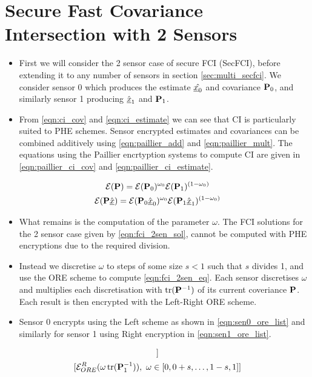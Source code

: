 \documentclass[letterpaper, 10 pt, conference]{ieeeconf}  %
\begin{document}
\section{Secure Fast Covariance Intersection with 2 Sensors} \label{sec:secfci}
\begin{itemize}
   \item First we will consider the 2 sensor case of secure FCI (SecFCI), before extending it to any number of sensors in section \ref{sec:multi_secfci}. We consider sensor 0 which produces the estimate $\hat{{\underline{x}}_0}$ and covariance ${{\mathbf{P}}}_0$, and similarly sensor 1 producing $\hat{{\underline{x}}}_1$ and ${{\mathbf{P}}}_1$.
   \item From \eqref{eqn:ci_cov} and \eqref{eqn:ci_estimate} we can see that CI is particularly suited to PHE schemes. Sensor encrypted estimates and covariances can be combined additively using \eqref{eqn:paillier_add} and \eqref{eqn:paillier_mult}. The equations using the Paillier encrtyption systems to compute CI are given in \eqref{eqn:paillier_ci_cov} and \eqref{eqn:paillier_ci_estimate}.
\end{itemize}
\begin{gather}
   \mathcal{E}({{\mathbf{P}}}) = \mathcal{E}({{\mathbf{P}}}_0)^{\omega_0}\mathcal{E}({{\mathbf{P}}}_1)^{(1 -\omega_0)} \label{eqn:paillier_ci_cov}\\
   \mathcal{E}({{\mathbf{P}}}\hat{{\underline{x}}}) = \mathcal{E}({{\mathbf{P}}}_0\hat{{\underline{x}}}_0)^{\omega_0}\mathcal{E}({{\mathbf{P}}}_1\hat{{\underline{x}}}_1)^{(1 - \omega_0)} \label{eqn:paillier_ci_estimate}\\
\end{gather}
\begin{itemize}
   \item What remains is the computation of the parameter $\omega$. The FCI solutions for the 2 sensor case given by \eqref{eqn:fci_2sen_sol}, cannot be computed with PHE encryptions due to the required division.
   \item Instead we discretise $\omega$ to steps of some size $s<1$ such that $s$ divides 1, and use the ORE scheme to compute \eqref{eqn:fci_2sen_eq}. Each sensor discretises $\omega$ and multiplies each discretisation with $\operatorname{tr}({{\mathbf{P}}}^{-1})$ of its current coveriance ${{\mathbf{P}}}$. Each result is then encrypted with the Left-Right ORE scheme.
   \item Sensor 0 encrypts using the Left scheme as shown in \eqref{eqn:sen0_ore_list} and similarly for sensor 1 using Right encryption in \eqref{eqn:sen1_ore_list}.
\end{itemize}
\begin{gather}
   [\mathcal{E}^L_{ORE}(\omega\tr(\mP^{-1}_0)),\ \omega \in [0,0+s,\dots,1-s,1]] \label{eqn:sen0_ore_list} \\
   [\mathcal{E}^R_{ORE}(\omega\tr(\mP^{-1}_1)),\ \omega \in [0,0+s,\dots,1-s,1]] \label{eqn:sen1_ore_list}
\end{gather}
\end{document}
